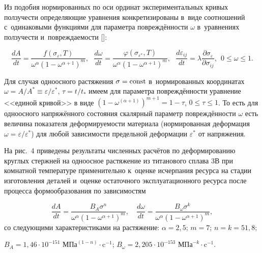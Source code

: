 Из подобия нормированных по оси ординат экспериментальных кривых ползучести определяющие уравнения конкретизированы в~виде соотношений с~одинаковыми функциями для параметра повреждённости $\omega$  в~уравнениях ползучести и~повреждаемости []:

$$\frac{dA}{dt}=\frac{f(\sigma_{\varepsilon},T)}{\omega^{\alpha}(1-\omega^{\alpha+1})^{m}},\ \ \

\frac{d\omega}{dt}=\frac{\varphi(\sigma_{\varepsilon^{*}},T)}{\omega^{\alpha}(1-\omega^{\alpha+1})^{m}},\ \ \

\frac{d\varepsilon_{ij}}{dt}=\lambda \frac{\partial\sigma_{\varepsilon}}{\partial\sigma_{ij}},\ \ 0\leq\omega\leq 1.

$$



Для случая одноосного растяжения $\sigma = \rm const$  в~нормированных координатах $\omega= A/A^{*}\equiv\varepsilon/\varepsilon^{*}$,   $\tau=t/t_{*}$  имеем для параметра повреждённости уравнение <<единой кривой>> в виде $(1-\omega^{(\alpha+1)})^{m+1}=1-\tau$, $0\leq\tau\leq 1$. То есть для одноосного напряжённого состояния скалярный параметр повреждённости $\omega$ есть величина показателя деформируемости материала (нормированная деформация $\omega=\varepsilon/\varepsilon^{*}$) для любой зависимости предельной деформации $\varepsilon^{*}$ от напряжения.






На рис.~4 приведены результаты численных расчётов по деформированию круглых стержней на одноосное растяжение из титанового сплава 3В при комнатной температуре применительно к~оценке исчерпания ресурса на стадии изготовления деталей и~оценке остаточного эксплуатационного ресурса после процесса формообразования по зависимостям

$$\frac{dA}{dt}=\frac{B_{A}\sigma^{n}}{\omega^{\alpha}(1-\omega^{\alpha+1})^{m}},\quad

\frac{d\omega}{dt}=\frac{B_{\omega}\sigma^{k}}{\omega^{\alpha}(1-\omega^{\alpha+1})^{m}},

$$ со следующими характеристиками на растяжение: $\alpha=2,5$; $m = 7$; $n = k = 51,8$;

$B_{A} =1,46\cdot10^{-151}\text{~МПа}^{(1-n)}\cdot\text{c}^{-1}$; $B_{\omega}=2,205\cdot 10^{-153}\text{~МПа}^{-k}\cdot\text{c}^{-1}$.





